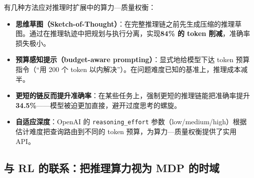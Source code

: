有几种方法应对推理时扩展中的算力—质量权衡：
\begin{itemize}
  \item \textbf{思维草图（Sketch-of-Thought）}：在完整推理链之前先生成压缩的推理草图。通过在推理轨迹中把规划与执行分离，实现\textbf{84\% 的 token 削减}，准确率损失极小。
  \item \textbf{预算感知提示（budget-aware prompting）}：显式地给模型下达 token 预算指令（“用 200 个 token 以内解决”）。在问题难度已知的基准上，推理成本减半。
  \item \textbf{更短的链反而提升准确率}：在某些任务上，强制更短的推理链能把准确率提升 \textbf{34.5\%}——模型被迫更加直接，避开过度思考的螺旋。
  \item \textbf{自适应深度}：OpenAI 的 \texttt{reasoning\_effort} 参数（low/medium/high）根据估计难度把查询路由到不同的 token 预算，为算力—质量权衡提供了实用 API。
\end{itemize}

\subsection{与 RL 的联系：把推理算力视为 MDP 的时域}
\label{subsec:inference-mdp-connection}

